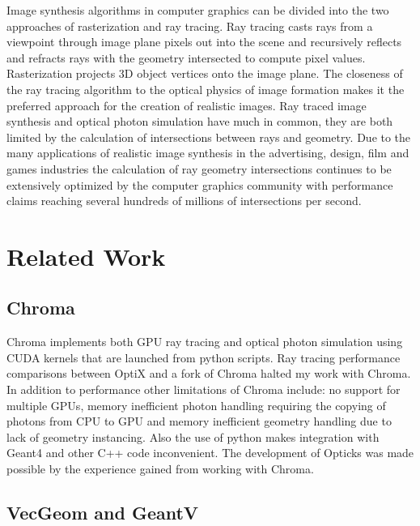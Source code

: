 \documentclass[a4paper]{jpconf}
\begin{document}
Image synthesis algorithms in computer graphics can be divided into 
the two approaches of rasterization and ray tracing. 
Ray tracing casts rays from a viewpoint through image plane pixels out 
into the scene and recursively reflects and refracts rays with the geometry intersected 
to compute pixel values. Rasterization projects 3D object vertices onto the image plane.
The closeness of the ray tracing algorithm to the optical physics of image formation
makes it the preferred approach for the creation of realistic images. 
Ray traced image synthesis and optical photon simulation have much in common, 
they are both limited by the calculation of intersections between rays and geometry.  
Due to the many applications of realistic image synthesis in the 
advertising, design, film and games industries the calculation of ray geometry intersections 
continues to be extensively optimized by the computer graphics community with performance claims 
reaching several hundreds of millions of intersections per second\cite{understanding}\cite{understandingAddendum}.


\section{Related Work}

\subsection{Chroma}

Chroma\cite{chromaURL}\cite{chromaB} implements both GPU ray tracing and optical photon simulation 
using CUDA kernels that are launched from python scripts. 
Ray tracing performance comparisons between OptiX and a fork of Chroma\cite{chromaFork} 
halted my work with Chroma.
In addition to performance other limitations of Chroma include:
no support for multiple GPUs, memory inefficient photon handling requiring the copying of photons from CPU to GPU
and memory inefficient geometry handling due to lack of geometry instancing.
Also the use of python makes integration with Geant4 and other C++ code inconvenient. 
The development of Opticks was made possible by the experience gained from working with Chroma.

\subsection{VecGeom and GeantV}

\end{document}
